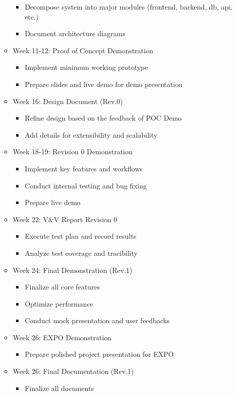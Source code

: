 \documentclass{article}
\begin{document}
\begin{itemize}
\begin{itemize}
			\begin{itemize}
			\item Decompose system into major modules (frontend, backend, db, api, etc.)
			\item Document architecture diagrams
			\end{itemize}
		\item Week 11-12: Proof of Concept Demonstration
			\begin{itemize}
			\item Implement minimum working prototype
			\item Prepare slides and live demo for demo presentation
			\end{itemize}
		\item Week 16: Design Document (Rev.0)
			\begin{itemize}
			\item Refine design based on the feedback of POC Demo
			\item Add details for extensibility and scalability
			\end{itemize}	
		\item Week 18-19: Revision 0  Demonstration
			\begin{itemize}
			\item Implement key features and workflows
			\item Conduct internal testing and bug fixing
			\item Prepare live demo
			\end{itemize}	
		\item Week 22: V\&V Report Revision 0
			\begin{itemize}
			\item Execute test plan and record results
			\item Analyze test coverage and tracibility
			\end{itemize}	
		\item Week 24: Final Demonstration (Rev.1)
			\begin{itemize}
			\item Finalize all core features
			\item Optimize performance
			\item Conduct mock presentation and user feedbacks
			\end{itemize}	
		\item Week 26: EXPO Demonstration
			\begin{itemize}
			\item Prepare polished project presentation for EXPO
			\end{itemize}	
		\item Week 26: Final Documentation (Rev.1)
			\begin{itemize}
			\item Finalize all documents
			\end{itemize}	
	\end{itemize}
\end{itemize}
\end{document}
